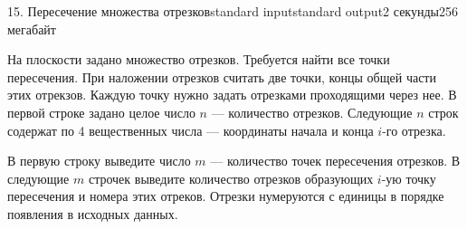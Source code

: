 \begin{problem}{15. Пересечение множества отрезков}{standard input}{standard output}{2 секунды}{256 мегабайт}

На плоскости задано множество отрезков. Требуется найти все точки пересечения.
При наложении отрезков считать две точки, концы общей части этих отрекзов.
Каждую точку нужно задать отрезками проходящими через нее.
\InputFile
В первой строке задано целое число $n$ --- количество отрезков.
Следующие $n$ строк содержат по 4 вещественных числа --- координаты начала и конца $i$-го отрезка.

\OutputFile
В первую строку выведите число $m$ --- количество точек пересечения отрезков.
В следующие $m$ строчек выведите количество отрезков образующих $i$-ую точку пересечения и номера этих отреков. Отрезки нумеруются с единицы в порядке появления в исходных данных.  
\Examples

\begin{example}%
%
\end{example}

\end{problem}